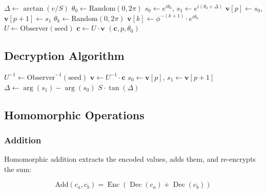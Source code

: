 \documentclass[11pt,a4paper]{article}
\theoremstyle{remark}
\DeclareMathOperator{\Enc}{Enc}
\DeclareMathOperator{\Dec}{Dec}
\begin{document}
\begin{algorithm}[H]
\caption{$\Enc(v, n)$ — RiemannFHE Encryption}
\begin{algorithmic}[1]
\State $\Delta \gets \arctan(v/S)$ 
\State $\theta_0 \gets \text{Random}(0, 2\pi)$ 
\State $s_0 \gets e^{i\theta_0}$, $s_1 \gets e^{i(\theta_0 + \Delta)}$ 
\State $\mathbf{v}[p] \gets s_0$, $\mathbf{v}[p+1] \gets s_1$ 
    \State $\theta_k \gets \text{Random}(0, 2\pi)$
    \State $\mathbf{v}[k] \gets \phi^{-(k+1)} \cdot e^{i\theta_k}$ 
\EndFor
\State $U \gets \text{Observer}(\text{seed})$ 
\State $\mathbf{c} \gets U \cdot \mathbf{v}$ 
\State \Return $(\mathbf{c}, p, \theta_0)$
\end{algorithmic}
\end{algorithm}

\subsection{Decryption Algorithm}

\begin{algorithm}[H]
\caption{$\Dec(\mathbf{c}, p)$ — RiemannFHE Decryption}
\begin{algorithmic}[1]
\State $U^{-1} \gets \text{Observer}^{-1}(\text{seed})$ 
\State $\mathbf{v} \gets U^{-1} \cdot \mathbf{c}$
\State $s_0 \gets \mathbf{v}[p]$, $s_1 \gets \mathbf{v}[p+1]$ 
\State $\Delta \gets \arg(s_1) - \arg(s_0)$ 
\State \Return $S \cdot \tan(\Delta)$ 
\end{algorithmic}
\end{algorithm}

\subsection{Homomorphic Operations}

\subsubsection{Addition}

Homomorphic addition extracts the encoded values, adds them, and re-encrypts the sum:

\begin{equation}
    \text{Add}(c_a, c_b) = \Enc(\Dec(c_a) + \Dec(c_b))
\end{equation}
\end{document}
